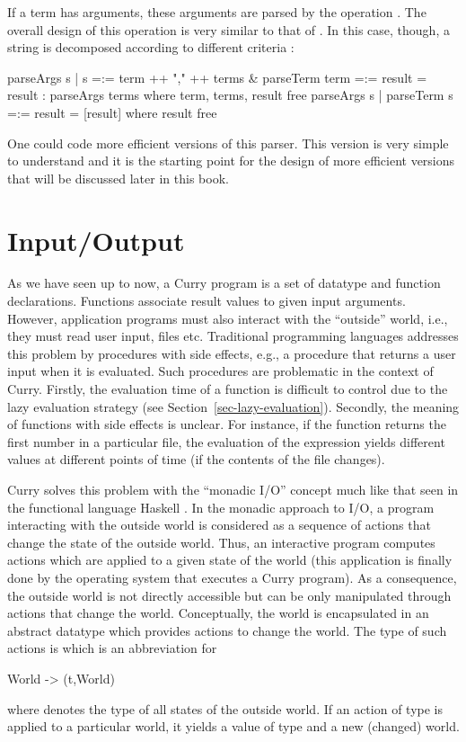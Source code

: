If a term has arguments, these arguments are parsed by the operation
.
The overall design of this operation is very similar to that
of .
In this case, though, a string is decomposed according to
different criteria
:
%
\begin{prog}
parseArgs s | s =:= term ++ "," ++ terms \&
              parseTerm term =:= result = result : parseArgs terms
  where term, terms, result free
\smallskip
parseArgs s | parseTerm s =:= result = [result]
  where result free
\end{prog}
%
One could code more efficient versions of this parser.
This version is very simple to understand and it is the
starting point for the design of more efficient versions that will be
discussed later in this book.


\section{Input/Output}
\label{sec-io}

As we have seen up to now, a Curry program is a set of datatype
and function declarations. Functions associate result values
to given input arguments. However, application programs must
also interact with the ``outside'' world, i.e., they
must read user input, files etc.
Traditional programming languages addresses this problem
by procedures with side effects, e.g., a procedure 
that returns a user input when it is evaluated.
Such procedures are problematic in the context of Curry.
Firstly, the evaluation time of a function is difficult
to control due to the lazy evaluation strategy
(see Section~\ref{sec-lazy-evaluation}). Secondly,
the meaning of functions with side effects is unclear.
For instance, if the function  returns
the first number in a particular file, the evaluation
of the expression  yields different values
at different points of time (if the contents of the file changes).

Curry solves this problem with the ``monadic I/O'' concept
 much like that seen in the functional language
Haskell \cite{Wadler97}.
In the monadic approach to I/O, a program interacting with
the outside world is considered as a sequence of actions that
change the state of the outside world. Thus, an interactive program
computes actions which are applied to a given state of the world
(this application is finally done by the operating system
that executes a Curry program).
As a consequence, the outside world is not directly
accessible but can be only manipulated through actions that change the world.
Conceptually, the world is encapsulated in an abstract datatype
which provides actions to change the world.
The type of such actions is 
which is an abbreviation for
\begin{prog}
World -> (t,World)
\end{prog}
where  denotes the type of all states of the outside world.
If an action of type  is applied to a particular world,
it yields a value of type  and a new (changed) world.

